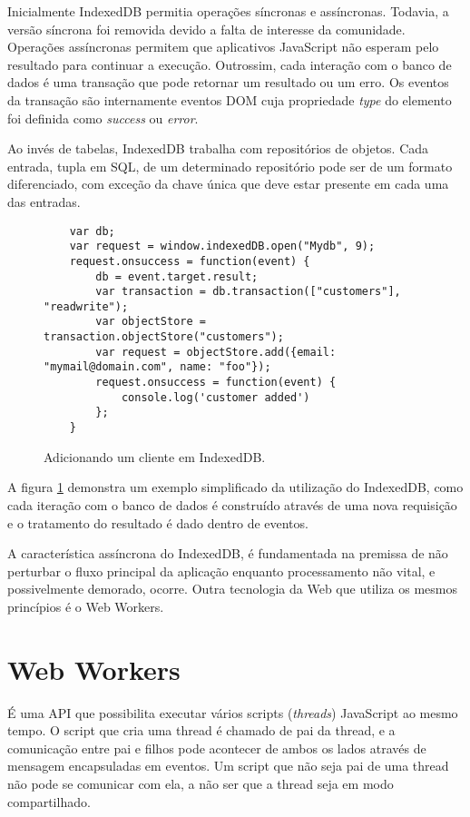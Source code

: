 Inicialmente IndexedDB permitia operações síncronas e assíncronas.
Todavia, a versão síncrona foi removida devido a falta de
interesse da comunidade. Operações assíncronas permitem que
aplicativos JavaScript não esperam pelo resultado para continuar a
execução. Outrossim, cada interação com o banco de dados é uma
transação que pode retornar um resultado ou um erro. Os eventos da
transação são internamente eventos DOM cuja propriedade \textit{type}
do elemento foi definida como \textit{success} ou \textit{error}.

Ao invés de tabelas, IndexedDB trabalha com repositórios de objetos.
Cada entrada, tupla em SQL, de um determinado repositório pode ser de
um formato diferenciado, com exceção da chave única que deve estar
presente em cada uma das entradas.

\begin{figure}[H]
\centering
\begin{verbatim}
	var db;
	var request = window.indexedDB.open("Mydb", 9);
	request.onsuccess = function(event) {
		db = event.target.result;
		var transaction = db.transaction(["customers"], "readwrite");
		var objectStore = transaction.objectStore("customers");
		var request = objectStore.add({email: "mymail@domain.com", name: "foo"});
		request.onsuccess = function(event) {
			console.log('customer added')
		};
	}
\end{verbatim}
\caption{Adicionando um cliente em IndexedDB.}
\label{fig:IndexedDB}
\end{figure}

A figura \ref{fig:IndexedDB} demonstra um exemplo simplificado da
utilização do IndexedDB, como cada iteração com o banco de dados é
construído através de uma nova requisição e o tratamento do resultado
é dado dentro de eventos.


A característica assíncrona do IndexedDB, é fundamentada na
premissa de não perturbar o fluxo principal da aplicação enquanto
processamento não vital, e possivelmente demorado, ocorre. Outra
tecnologia da Web que utiliza os mesmos princípios é o Web Workers.

\section{Web Workers}

É uma API que possibilita executar vários scripts
(\textit{threads}) JavaScript ao mesmo tempo. O script que cria uma
thread é chamado de pai da thread, e a comunicação entre pai e filhos
pode acontecer de ambos os lados através de mensagem encapsuladas
em eventos. Um script que não seja pai de uma thread não pode se
comunicar com ela, a não ser que a thread seja em modo compartilhado.

